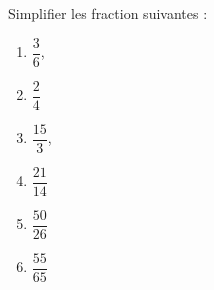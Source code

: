 
\begin{exercice}\label{exosmath-0910}

    Simplifier les fraction suivantes :
    \begin{multicols}{3}
        \begin{enumerate}
            \item
                \( \dfrac{ 3 }{ 6 }\),
            \item
                \( \dfrac{ 2 }{ 4 }\)
            \item
                \( \dfrac{ 15 }{ 3 }\),
            \item
                \( \dfrac{ 21 }{ 14 }\)
            \item
                \( \dfrac{ 50 }{ 26 }\)
            \item
                \( \dfrac{ 55 }{ 65 }\)
        \end{enumerate}
    \end{multicols}

\end{exercice}
